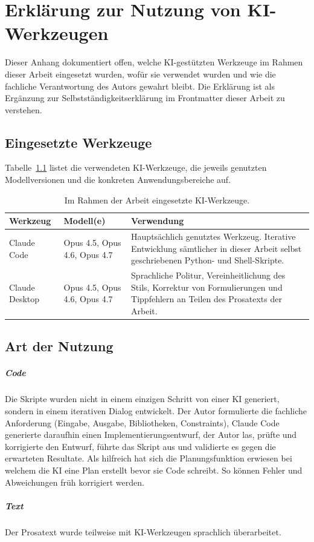 \chapter{Erklärung zur Nutzung von KI-Werkzeugen}
\label{app:ki_werkzeuge}

Dieser Anhang dokumentiert offen, welche KI-gestützten Werkzeuge im Rahmen dieser Arbeit eingesetzt wurden, wofür sie verwendet wurden und wie die fachliche Verantwortung des Autors gewahrt bleibt.
Die Erklärung ist als Ergänzung zur Selbstständigkeitserklärung im Frontmatter dieser Arbeit zu verstehen.

\section{Eingesetzte Werkzeuge}
\label{app:ki_werkzeuge_uebersicht}

Tabelle~\ref{tab:ki_werkzeuge} listet die verwendeten KI-Werkzeuge, die jeweils genutzten Modellversionen und die konkreten Anwendungsbereiche auf.

\begin{table}[H]
\centering
\caption{Im Rahmen der Arbeit eingesetzte KI-Werkzeuge.}
\label{tab:ki_werkzeuge}
\begin{tabular}{p{3.6cm}p{3.4cm}p{6.5cm}}
\hline
Werkzeug & Modell(e) & Verwendung \\
\hline
Claude Code & Opus 4.5, Opus 4.6, Opus 4.7 & Hauptsächlich genutztes Werkzeug. Iterative Entwicklung sämtlicher in dieser Arbeit selbst geschriebenen Python- und Shell-Skripte. \\
Claude Desktop & Opus 4.5, Opus 4.6, Opus 4.7 & Sprachliche Politur, Vereinheitlichung des Stils, Korrektur von Formulierungen und Tippfehlern an Teilen des Prosatexts der Arbeit. \\
\hline
\end{tabular}
\end{table}

\section{Art der Nutzung}
\label{app:ki_werkzeuge_nutzung}

\paragraph{Code}
Die Skripte wurden nicht in einem einzigen Schritt von einer KI generiert, sondern in einem iterativen Dialog entwickelt.
Der Autor formulierte die fachliche Anforderung (Eingabe, Ausgabe, Bibliotheken, Constraints), Claude Code generierte daraufhin einen Implementierungsentwurf, der Autor las, prüfte und korrigierte den Entwurf, führte das Skript aus und validierte es gegen die erwarteten Resultate.
Als hilfreich hat sich die Planungsfunktion erwiesen bei welchem die KI eine Plan erstellt bevor sie Code schreibt. So können Fehler und Abweichungen früh korrigiert werden.

\paragraph{Text}
Der Prosatext wurde teilweise mit KI-Werkzeugen sprachlich überarbeitet.